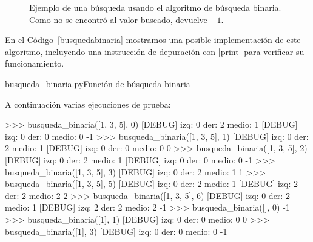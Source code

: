 \begin{figure}[h!t]
\begin{center}
\end{center}
\caption{Ejemplo de una búsqueda usando el algoritmo de búsqueda binaria.
Como no se encontró al valor buscado, devuelve $-1$.}
\label{fig:busqbin}
\end{figure}

En el Código~\ref{busquedabinaria} mostramos una posible implementación de
este algoritmo, incluyendo una instrucción de depuración con |print| para
verificar su funcionamiento.

\begin{codigo}{busqueda\_binaria.py}{Función de búsqueda binaria}
\label{busquedabinaria}

\end{codigo}

A continuación varias ejecuciones de prueba:

\begin{codigo-python-sn}
>>> busqueda_binaria([1, 3, 5], 0)
[DEBUG] izq: 0 der: 2 medio: 1
[DEBUG] izq: 0 der: 0 medio: 0
-1
>>> busqueda_binaria([1, 3, 5], 1)
[DEBUG] izq: 0 der: 2 medio: 1
[DEBUG] izq: 0 der: 0 medio: 0
0
>>> busqueda_binaria([1, 3, 5], 2)
[DEBUG] izq: 0 der: 2 medio: 1
[DEBUG] izq: 0 der: 0 medio: 0
-1
>>> busqueda_binaria([1, 3, 5], 3)
[DEBUG] izq: 0 der: 2 medio: 1
1
>>> busqueda_binaria([1, 3, 5], 5)
[DEBUG] izq: 0 der: 2 medio: 1
[DEBUG] izq: 2 der: 2 medio: 2
2
>>> busqueda_binaria([1, 3, 5], 6)
[DEBUG] izq: 0 der: 2 medio: 1
[DEBUG] izq: 2 der: 2 medio: 2
-1
>>> busqueda_binaria([], 0)
-1
>>> busqueda_binaria([1], 1)
[DEBUG] izq: 0 der: 0 medio: 0
0
>>> busqueda_binaria([1], 3)
[DEBUG] izq: 0 der: 0 medio: 0
-1
\end{codigo-python-sn}

